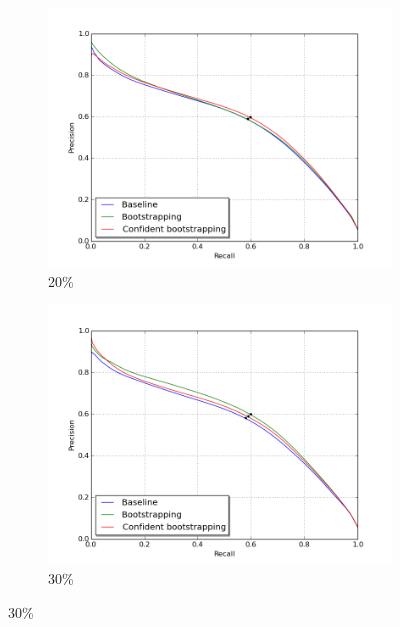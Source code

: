 \begin{figure}[H]
\begin{subfigure}{0.31\textwidth}
\end{subfigure}
\hspace*{\fill} %
\begin{subfigure}{0.31\textwidth}
\includegraphics[width=\textwidth]{figs/E2/pr_2.png}
\caption{20\% } \label{fig:app_E2_2_pr}
\vspace{0.1cm} %
\end{subfigure}
\begin{subfigure}{0.31\textwidth}
\includegraphics[width=\textwidth]{figs/E2/pr_3.png}
\caption{ 30\%} \label{fig:app_E2_3_pr}
\vspace{0.1cm} %

\end{subfigure}
\end{figure}
